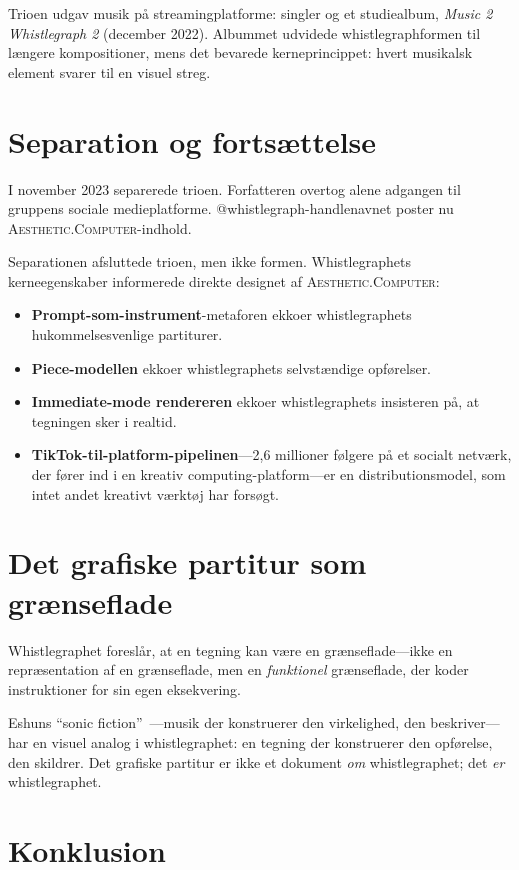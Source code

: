 \documentclass[10pt,letterpaper,twocolumn]{article}
\newcommand{\ac}{\textsc{Aesthetic.Computer}}
\begin{document}
Trioen udgav musik på streamingplatforme: singler og et studiealbum, \emph{Music 2 Whistlegraph 2} (december 2022). Albummet udvidede whistlegraphformen til længere kompositioner, mens det bevarede kerneprincippet: hvert musikalsk element svarer til en visuel streg.

\section{Separation og fortsættelse}

I november 2023 separerede trioen. Forfatteren overtog alene adgangen til gruppens sociale medieplatforme. @whistlegraph-handlenavnet poster nu \ac{}-indhold.

Separationen afsluttede trioen, men ikke formen. Whistlegraphets kerneegenskaber informerede direkte designet af \ac{}:

\begin{itemize}
  \item \textbf{Prompt-som-instrument}-metaforen ekkoer whistlegraphets hukommelsesvenlige partiturer.
  \item \textbf{Piece-modellen} ekkoer whistlegraphets selvstændige opførelser.
  \item \textbf{Immediate-mode rendereren} ekkoer whistlegraphets insisteren på, at tegningen sker i realtid.
  \item \textbf{TikTok-til-platform-pipelinen}---2,6 millioner følgere på et socialt netværk, der fører ind i en kreativ computing-platform---er en distributionsmodel, som intet andet kreativt værktøj har forsøgt.
\end{itemize}

\section{Det grafiske partitur som grænseflade}

Whistlegraphet foreslår, at en tegning kan være en grænseflade---ikke en repræsentation af en grænseflade, men en \emph{funktionel} grænseflade, der koder instruktioner for sin egen eksekvering.

Eshuns ``sonic fiction''~\citep{eshun1998more}---musik der konstruerer den virkelighed, den beskriver---har en visuel analog i whistlegraphet: en tegning der konstruerer den opførelse, den skildrer. Det grafiske partitur er ikke et dokument \emph{om} whistlegraphet; det \emph{er} whistlegraphet.

\section{Konklusion}
\end{document}
